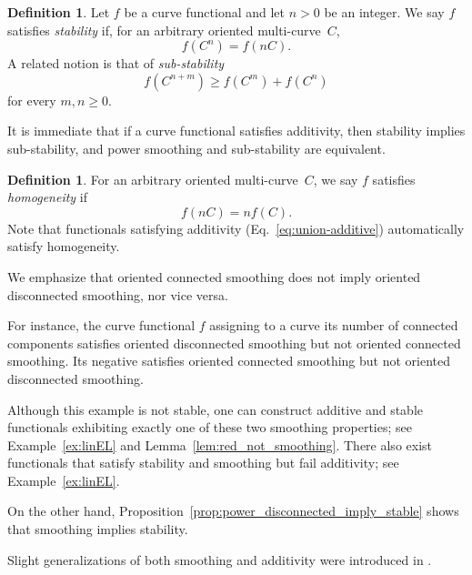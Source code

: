 \documentclass[11pt]{amsart}
\numberwithin{equation}{section}
\numberwithin{figure}{section}
\theoremstyle{definition}
\newtheorem{definition}[theorem]{Definition}
\theoremstyle{plain}
\begin{document}
\begin{definition}\label{def:stable}
     Let $f$ be a curve
     functional and let $n>0$ be an
     integer. We say $f$ satisfies \emph{stability} if, for an arbitrary oriented multi-curve~$C$,
       \begin{equation}
         \label{eq:stable}
         f(C^n) = f(nC).
       \end{equation}
       A related notion is that of \emph{sub-stability}
       \begin{equation}
       	\label{eq:substable}
       	f(C^{n+m}) \geq f(C^m) + f(C^n)
       \end{equation} 
       for every $m,n \geq 0$. 
\end{definition}

It is immediate that if a curve functional satisfies additivity, then stability implies sub-stability, and power smoothing and sub-stability are equivalent.

\begin{definition}\label{def:homogeneous} For an arbitrary oriented
  multi-curve~$C$, we say $f$ satisfies \emph{homogeneity} if
       \begin{equation}
         \label{eq:homogeneous}
         f(nC) = nf(C).
       \end{equation}
       Note that functionals satisfying additivity (Eq.~\eqref{eq:union-additive}) automatically satisfy homogeneity.
\end{definition}

We emphasize that oriented connected smoothing does not imply oriented
disconnected smoothing, nor vice versa.

For instance, the curve functional $f$ assigning to a curve its number
of connected components satisfies oriented disconnected smoothing but
not oriented connected smoothing. Its negative satisfies oriented
connected smoothing but not oriented disconnected smoothing.

Although this example is not stable, one can construct additive and
stable functionals exhibiting exactly one of these two smoothing
properties;
see Example~\ref{ex:linEL} and
Lemma~\ref{lem:red_not_smoothing}.
There also exist functionals that satisfy stability and smoothing but
fail additivity; see
Example~\ref{ex:linEL}.

On the other hand, Proposition~\ref{prop:power_disconnected_imply_stable} shows that
smoothing implies stability. 

Slight generalizations of both smoothing and additivity were
introduced in \cite{MGT21:Smoothings}.
\end{document}
